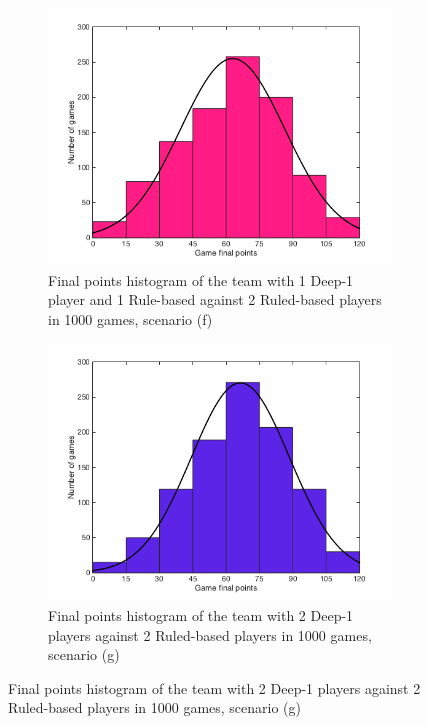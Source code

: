 \begin{figure}[h]
  \centering
	\begin{subfigure}[h]{0.49\textwidth}
    	\includegraphics[width=\textwidth]{./img/appendix/histF}
    	\caption{Final points histogram of the team with 1 Deep-1 player and 1 Rule-based against 2 Ruled-based players in 1000 games, scenario (f)}
    \end{subfigure}
    \begin{subfigure}[h]{0.49\textwidth}
    	\includegraphics[width=\textwidth]{./img/appendix/histG}
    	\caption{Final points histogram of the team with 2 Deep-1 players against 2 Ruled-based players in 1000 games, scenario (g)}
    \end{subfigure}
\label{app:histogramFG}
\end{figure}

